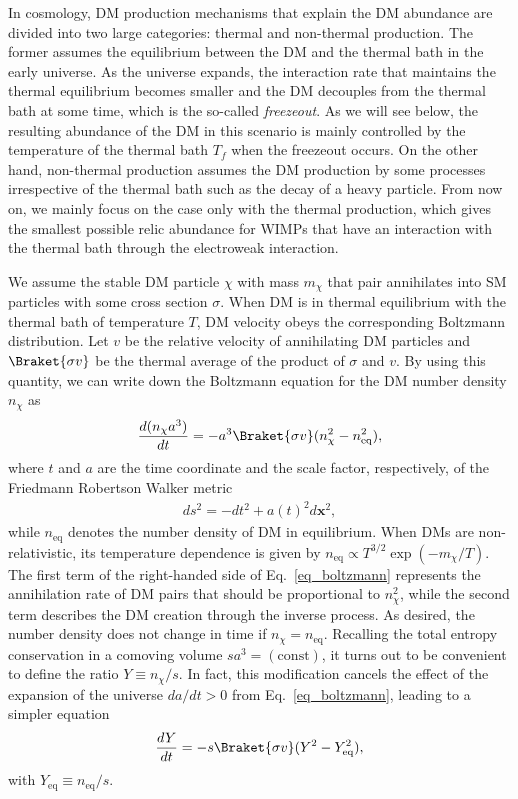 \documentclass[12pt,twoside,book]{article}
\begin{document}
In cosmology, DM production mechanisms that explain the DM abundance are divided into two large categories: thermal and non-thermal production.
The former assumes the equilibrium between the DM and the thermal bath in the early universe.
As the universe expands, the interaction rate that maintains the thermal equilibrium becomes smaller and the DM decouples from the thermal bath at some time, which is the so-called \textit{freezeout}.
As we will see below, the resulting abundance of the DM in this scenario is mainly controlled by the temperature of the thermal bath $T_f$ when the freezeout occurs.
On the other hand, non-thermal production assumes the DM production by some processes irrespective of the thermal bath such as the decay of a heavy particle.
From now on, we mainly focus on the case only with the thermal production, which gives the smallest possible relic abundance for WIMPs that have an interaction with the thermal bath through the electroweak interaction.

We assume the stable DM particle $\chi$ with mass $m_\chi$ that pair annihilates into SM particles with some cross section $\sigma$.
When DM is in thermal equilibrium with the thermal bath of temperature $T$, DM velocity obeys the corresponding Boltzmann distribution.
Let $v$ be the relative velocity of annihilating DM particles and $\Braket{\sigma v}$ be the thermal average of the product of $\sigma$ and $v$.
By using this quantity, we can write down the Boltzmann equation for the DM number density $n_\chi$ as
\begin{align}
  \frac{d (n_\chi a^3)}{d t} =
  - a^3 \Braket{\sigma v} (n_\chi^2 - n_{\mathrm{eq}}^2),\label{eq_boltzmann}
\end{align}
where $t$ and $a$ are the time coordinate and the scale factor, respectively, of the Friedmann Robertson Walker metric
\begin{align}
  d s^2 = - d t^2 + a(t)^2 d \bm{x}^2,
\end{align}
while $n_{\mathrm{eq}}$ denotes the number density of DM in equilibrium.
When DMs are non-relativistic, its temperature dependence is given by $n_{\mathrm{eq}} \propto T^{3/2} \exp \left( -m_\chi / T \right)$.
The first term of the right-handed side of Eq.~\eqref{eq_boltzmann} represents the annihilation rate of DM pairs that should be proportional to $n_\chi^2$, while the second term describes the DM creation through the inverse process.
As desired, the number density does not change in time if $n_\chi = n_{\mathrm{eq}}$.  Recalling the total entropy conservation in a comoving volume $s a^3 = (\mathrm{const})$, it turns out to be convenient to define the ratio $Y \equiv n_\chi / s$.
In fact, this modification cancels the effect of the expansion of the universe $da / dt > 0$ from Eq.~\eqref{eq_boltzmann}, leading to a simpler equation
\begin{align}
  \frac{d Y}{d t} =
  -s \Braket{\sigma v} (Y^2 - Y_{\mathrm{eq}}^2),\label{eq_boltzmann_Yt}
\end{align}
with $Y_{\mathrm{eq}} \equiv n_{\mathrm{eq}} / s$.
\end{document}
